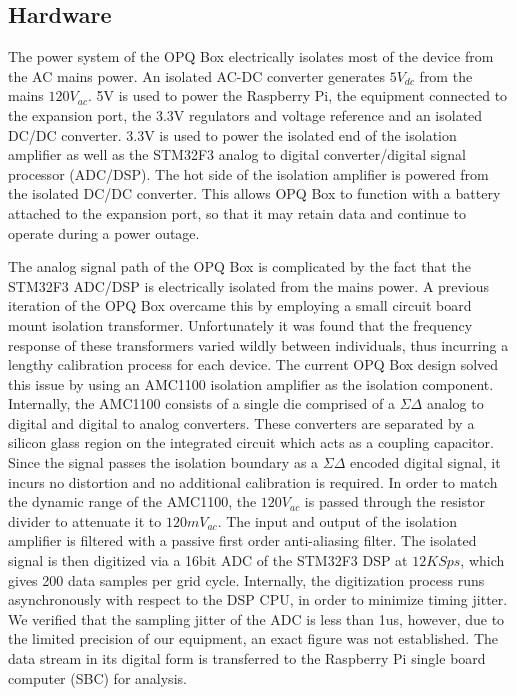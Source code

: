 \subsection{Hardware}\label{subsec:hardware}

The power system of the OPQ Box electrically isolates most of the device from the AC mains power.
An isolated AC-DC converter generates $5V_{dc}$ from the mains $120V_{ac}$.
5V is used to power the Raspberry Pi, the equipment connected to the expansion port, the 3.3V regulators and voltage reference and an isolated DC/DC converter.
3.3V is used to power the isolated end of the isolation amplifier as well as the STM32F3 analog to digital converter/digital signal processor (ADC/DSP).
The hot side of the isolation amplifier is powered from the isolated DC/DC converter.
This allows OPQ Box to function with a battery attached to the expansion port, so that it may retain data and continue to operate during a power outage.

The analog signal path of the OPQ Box is complicated by the fact that the STM32F3 ADC/DSP is electrically isolated from the mains power.
A previous iteration of the OPQ Box overcame this by employing a small circuit board mount isolation transformer.
Unfortunately it was found that the frequency response of these transformers varied wildly between individuals, thus incurring a lengthy calibration process for each device.
The current OPQ Box design solved this issue by using an AMC1100 isolation amplifier as the isolation component.
Internally, the AMC1100 consists of a single die comprised of a $\Sigma\Delta$ analog to digital and digital to analog converters.
These converters are separated by a silicon glass region on the integrated circuit which acts as a coupling capacitor.
Since the signal passes the isolation boundary as a $\Sigma\Delta$ encoded digital signal, it incurs no distortion and no additional calibration is required.
In order to match the dynamic range of the AMC1100, the $120V_{ac}$ is passed through the resistor divider to attenuate it to $120mV_{ac}$.
The input and output of the isolation amplifier is filtered with a passive first order anti-aliasing filter.
The isolated signal is then digitized via a 16bit ADC of the STM32F3 DSP at $12 KSps$, which gives 200 data samples per grid cycle.
Internally, the digitization process runs asynchronously with respect to the DSP CPU, in order to minimize timing jitter.
We verified that the sampling jitter of the ADC is less than 1us, however, due to the limited precision of our equipment, an exact figure was not established.
The data stream in its digital form is transferred to the Raspberry Pi single board computer (SBC) for analysis.

